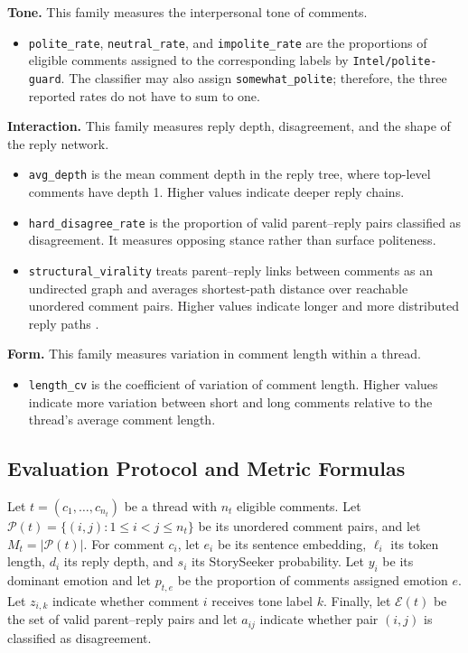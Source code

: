 \textbf{Tone.}
This family measures the interpersonal tone of comments.
\begin{itemize}
    \item \texttt{polite\_rate}, \texttt{neutral\_rate}, and
    \texttt{impolite\_rate} are the proportions of eligible comments assigned
    to the corresponding labels by \texttt{Intel/polite-guard}. The classifier
    may also assign \texttt{somewhat\_polite}; therefore, the three reported
    rates do not have to sum to one.
\end{itemize}

\textbf{Interaction.}
This family measures reply depth, disagreement, and the shape of the reply
network.
\begin{itemize}
    \item \texttt{avg\_depth} is the mean comment depth in the reply tree,
    where top-level comments have depth 1. Higher values indicate deeper reply
    chains.

    \item \texttt{hard\_disagree\_rate} is the proportion of valid
    parent--reply pairs classified as disagreement. It measures opposing stance
    rather than surface politeness.

    \item \texttt{structural\_virality} treats parent--reply links between
    comments as an undirected graph and averages shortest-path distance over
    reachable unordered comment pairs. Higher values indicate longer and more
    distributed reply paths \citep{goel2016structural}.
\end{itemize}

\textbf{Form.}
This family measures variation in comment length within a thread.
\begin{itemize}
    \item \texttt{length\_cv} is the coefficient of variation of comment
    length. Higher values indicate more variation between short and long
    comments relative to the thread's average comment length.
\end{itemize}

\subsection{Evaluation Protocol and Metric Formulas}
\label{sec:eval_process}

Let $t=(c_1,\ldots,c_{n_t})$ be a thread with $n_t$ eligible comments. Let
$\mathcal{P}(t)=\{(i,j):1\leq i<j\leq n_t\}$ be its unordered comment pairs,
and let $M_t=|\mathcal{P}(t)|$. For comment $c_i$, let $e_i$ be its sentence
embedding, $\ell_i$ its token length, $d_i$ its reply depth, and $s_i$ its
StorySeeker probability. Let $y_i$ be its dominant emotion and let $p_{t,e}$
be the proportion of comments assigned emotion $e$. Let $z_{i,k}$ indicate
whether comment $i$ receives tone label $k$. Finally, let $\mathcal{E}(t)$ be
the set of valid parent--reply pairs and let $a_{ij}$ indicate whether pair
$(i,j)$ is classified as disagreement.

